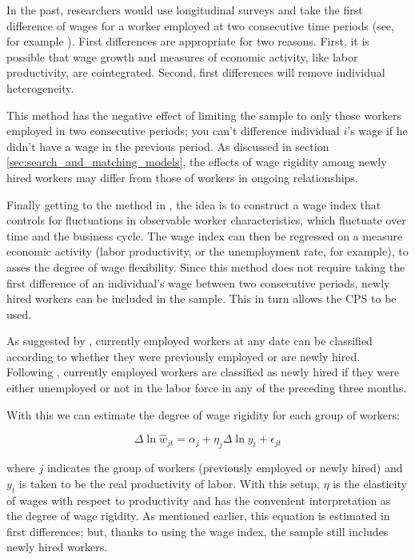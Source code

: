 \documentclass[11pt]{article}
\begin{document}
In the past, researchers would use longitudinal surveys and take the first difference of wages for a worker employed at two consecutive time periods (see, for example \citep{bils_1985}).
First differences are appropriate for two reasons.
First, it is possible that wage growth and measures of economic activity, like labor productivity, are cointegrated.
Second, first differences will remove individual heterogeneity.

This method has the negative effect of limiting the sample to only those workers employed in two consecutive periods;
you can't difference individual $i$'s wage if he didn't have a wage in the previous period.
As discussed in section \autoref{sec:search_and_matching_models}, the effects of wage rigidity among newly hired workers may differ from those of workers in ongoing relationships.

Finally getting to the method in \cite{haefke_sonntag_vanRens_2013}, the idea is to construct a wage index that controls for fluctuations in observable worker characteristics,
which fluctuate over time and the business cycle.
The wage index can then be regressed on a measure economic activity (labor productivity, or the unemployment rate, for example), to asses the degree of wage flexibility.
Since this method does not require taking the first difference of an individual's wage between two consecutive periods, newly hired workers can be included in the sample.
This in turn allows the CPS to be used.

As suggested by \cite{pissarides_2009}, currently employed workers at any date can be classified according to whether they were previously employed or are newly hired.
Following \cite{haefke_sonntag_vanRens_2013}, currently employed workers are classified as newly hired if they were either unemployed or not in the labor force in any of the preceding three months.

With this we can estimate the degree of wage rigidity for each group of workers:

\begin{equation}
    \label{eq:second_stage}
    \Delta \ln \hat{w}_{jt} = \alpha_j + \eta_j \Delta \ln y_t + \epsilon_{jt}
\end{equation}

where $j$ indicates the group of workers (previously employed or newly hired) and $y_t$ is taken to be the real productivity of labor.
With this setup, $\eta$ is the elasticity of wages with respect to productivity and has the convenient interpretation as the degree of wage rigidity.
As mentioned earlier, this equation is estimated in first differences;
but, thanks to using the wage index, the sample still includes newly hired workers.
\end{document}
